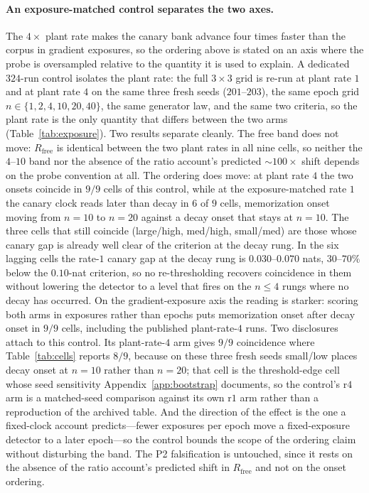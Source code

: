 \documentclass[11pt]{article}
\begin{document}
\paragraph{An exposure-matched control separates the two axes.}\label{sec:p3exposure}
The $4\times$ plant rate makes the canary bank advance four times faster than the
corpus in gradient exposures, so the ordering above is stated on an axis where the
probe is oversampled relative to the quantity it is used to explain. A dedicated
$324$-run control isolates the plant rate: the full $3\times3$ grid is re-run at
plant rate $1$ and at plant rate $4$ on the same three fresh seeds ($201$--$203$),
the same epoch grid $n\in\{1,2,4,10,20,40\}$, the same generator law, and the same
two criteria, so the plant rate is the only quantity that differs between the two
arms (Table~\ref{tab:exposure}).
Two results separate cleanly. The free band does not move: $R_{\mathrm{free}}$ is
identical between the two plant rates in all nine cells, so neither the $4$--$10$
band nor the absence of the ratio account's predicted ${\sim}100\times$ shift
depends on the probe convention at all. The ordering does move: at plant rate $4$
the two onsets coincide in $9/9$ cells of this control, while at the
exposure-matched rate $1$ the canary clock reads later than decay in $6$ of $9$
cells, memorization onset moving from $n{=}10$ to $n{=}20$ against a decay onset
that stays at $n{=}10$. The three cells that still coincide (large/high, med/high,
small/med) are those whose canary gap is already well clear of the criterion at the
decay rung. In the six lagging cells the rate-$1$ canary gap at the decay rung is
$0.030$--$0.070$ nats, $30$--$70\%$ below the $0.10$-nat criterion, so no
re-thresholding recovers coincidence in them without lowering the detector to a
level that fires on the $n\leq4$ rungs where no decay has occurred.
On the gradient-exposure axis the reading is starker: scoring both arms in exposures
rather than epochs puts memorization onset after decay onset in $9/9$ cells,
including the published plant-rate-$4$ runs.
Two disclosures attach to this control. Its plant-rate-$4$ arm gives $9/9$
coincidence where Table~\ref{tab:cells} reports $8/9$, because on these three fresh
seeds small/low places decay onset at $n{=}10$ rather than $n{=}20$; that cell is
the threshold-edge cell whose seed sensitivity Appendix~\ref{app:bootstrap}
documents, so the control's r$4$ arm is a matched-seed comparison against its own
r$1$ arm rather than a reproduction of the archived table. And the direction of the
effect is the one a fixed-clock account predicts---fewer exposures per epoch move a
fixed-exposure detector to a later epoch---so the control bounds the scope of the
ordering claim without disturbing the band. The P2 falsification is untouched, since
it rests on the absence of the ratio account's predicted shift in
$R_{\mathrm{free}}$ and not on the onset ordering.
\end{document}
